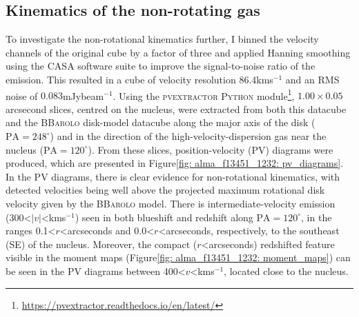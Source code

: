 \subsection{Kinematics of the non-rotating gas}
\label{section: alma_f13451_1232: analysis_and_results: outflow_kinematics}

To investigate the non-rotational kinematics further, I binned the velocity channels of the original cube by a factor of three and applied Hanning smoothing using the \textsc{CASA} software suite \citep{Bean2022} to improve the signal-to-noise ratio of the emission. This resulted in a cube of velocity resolution 86.4\;km\;s$^{-1}$ and an RMS noise of $0.083$\;mJy\;beam$^{-1}$. Using the \textsc{pvextractor Python} module\footnote{\url{https://pvextractor.readthedocs.io/en/latest/}}, $1.00\times0.05$\;arcsecond slices, centred on the nucleus, were extracted from both this datacube and the \textsc{BBarolo} disk-model datacube along the major axis of the disk ($\mathrm{PA}=248^\circ$) and in the direction of the high-velocity-dispersion gas near the nucleus ($\mathrm{PA}=120^\circ$). From these slices, position-velocity (PV) diagrams were produced, which are presented in Figure\;\ref{fig: alma_f13451_1232: pv_diagrams}. In the PV diagrams, there is clear evidence for non-rotational kinematics, with detected velocities being well above the projected maximum rotational disk velocity given by the \textsc{BBarolo} model. There is intermediate-velocity emission (300\;\textless\;$|v|$\;\textless{}\;km\;s$^{-1}$) seen in both blueshift and redshift along $\mathrm{PA}=120^\circ$, in the ranges 0.1\;\textless\;$r$\;\textless{}\;arcseconds and 0.0\;\textless\;$r$\;\textless{}\;arcseconds, respectively, to the southeast (SE) of the nucleus. Moreover, the compact ($r$\;\textless{}\;arcseconds) redshifted feature visible in the moment maps (Figure\;\ref{fig: alma_f13451_1232: moment_maps}) can be seen in the PV diagrams between 400\;\textless\;$v$\;\textless{}\;km\;s$^{-1}$, located close to the nucleus.

